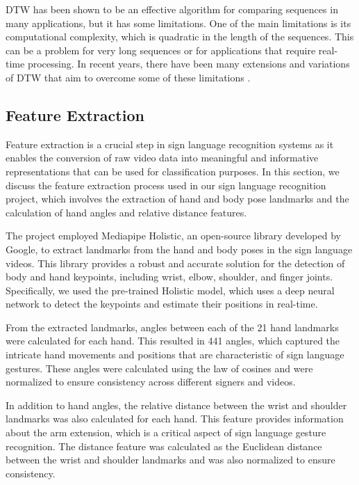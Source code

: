 \documentclass[final,rdr32.tex]{subfiles}
\begin{document}
DTW has been shown to be an effective algorithm for comparing sequences in many applications, but it has some limitations. One of the main limitations is its computational complexity, which is quadratic in the length of the sequences. This can be a problem for very long sequences or for applications that require real-time processing. In recent years, there have been many extensions and variations of DTW that aim to overcome some of these limitations \cite{ratanamahatana2004everything}.



\subsection{Feature Extraction}

Feature extraction is a crucial step in sign language recognition systems as it enables the conversion of raw video data into meaningful and informative representations that can be used for classification purposes. In this section, we discuss the feature extraction process used in our sign language recognition project, which involves the extraction of hand and body pose landmarks and the calculation of hand angles and relative distance features.

The project employed Mediapipe Holistic, an open-source library developed by Google, to extract landmarks from the hand and body poses in the sign language videos. This library provides a robust and accurate solution for the detection of body and hand keypoints, including wrist, elbow, shoulder, and finger joints. Specifically, we used the pre-trained Holistic model, which uses a deep neural network to detect the keypoints and estimate their positions in real-time.

From the extracted landmarks, angles between each of the 21 hand landmarks were calculated for each hand. This resulted in 441 angles, which captured the intricate hand movements and positions that are characteristic of sign language gestures. These angles were calculated using the law of cosines and were normalized to ensure consistency across different signers and videos.

In addition to hand angles, the relative distance between the wrist and shoulder landmarks was also calculated for each hand. This feature provides information about the arm extension, which is a critical aspect of sign language gesture recognition. The distance feature was calculated as the Euclidean distance between the wrist and shoulder landmarks and was also normalized to ensure consistency.
\end{document}
